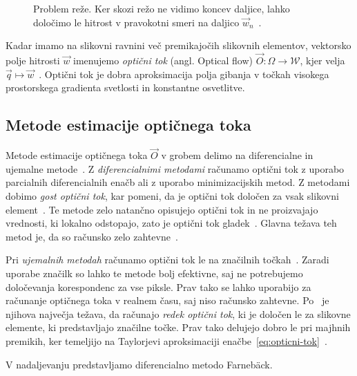 \begin{figure}[htb]
\centering

\caption[Problem reže]{Problem reže. Ker skozi režo ne vidimo koncev daljice, lahko določimo le hitrost v pravokotni smeri na daljico $\vec{w}_n$~\cite{trucco1998introductory}.}
\label{fig:aperture-problem}
\end{figure}




Kadar imamo na slikovni ravnini več premikajočih slikovnih elementov, vektorsko polje hitrosti $\vec{w}$ imenujemo \emph{optični tok} (angl. Optical flow) $\vec{O}: \varOmega \to \mathcal{W}$, kjer velja $ \vec{q} \mapsto \vec{w}$~\cite{trucco1998introductory}. Optični tok je dobra aproksimacija polja gibanja v točkah visokega prostorskega gradienta svetlosti in konstantne osvetlitve.



\subsection{Metode estimacije optičnega toka}\label{sec:metode-of}

Metode estimacije optičnega toka $\vec{O}$ v grobem delimo na diferencialne in {ujemalne} metode~\cite{trucco1998introductory}. Z \emph{diferencialnimi metodami} računamo optični tok z uporabo parcialnih diferencialnih enačb ali z uporabo minimizacijskih metod. Z metodami dobimo \emph{gost optični tok}, kar pomeni, da je optični tok določen za vsak slikovni element~\cite{trucco1998introductory}. Te metode zelo natančno opisujejo optični tok in ne proizvajajo vrednosti, ki lokalno odstopajo, zato je optični tok gladek~\cite{brox2011large}.  Glavna težava teh metod je, da so računsko zelo zahtevne~\cite{trucco1998introductory}.

Pri \emph{ujemalnih metodah} računamo optični tok le na značilnih točkah~\cite{trucco1998introductory}. Zaradi uporabe značilk so lahko te metode bolj efektivne, saj ne potrebujemo določevanja korespondenc za vse piksle. Prav tako se lahko uporabijo za računanje optičnega toka v realnem času, saj niso računsko zahtevne. Po~\cite{trucco1998introductory} je njihova največja težava, da računajo \emph{redek optični tok}, ki je določen le za slikovne elemente, ki predstavljajo značilne točke. Prav tako delujejo dobro le pri majhnih premikih, ker temeljijo na Taylorjevi aproksimaciji enačbe~\eqref{eq:opticni-tok}~\cite{wedel2011stereo}. 

V nadaljevanju predstavljamo diferencialno metodo Farneb{\"a}ck.


